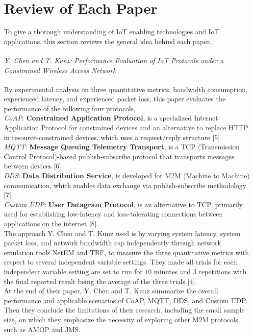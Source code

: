 \documentclass[conference]{IEEEtran}
\begin{document}
\section{Review of Each Paper}
To give a thorough understanding of IoT enabling technologies and IoT applications, this section reviews the general idea behind each paper.\\
\\
\textit{Y. Chen and T. Kunz: Performance Evaluation of IoT Protocols under a Constrained Wireless Access Network}
\\
\\
\text{\quad} By experimental analysis on three quantitative metrics, bandwidth consumption, experienced latency, and experienced packet loss, this paper evaluates the performance of the following four protocols,\\
\text{\quad} \textit{CoAP}: \textbf{Constrained Application Protocol}, is a specialized Internet Application Protocol for constrained devices and an alternative to replace HTTP in resource-constrained devices, which uses a request/reply structure [5]. \\
\text{\quad} \textit{MQTT}: \textbf{Message Queuing Telemetry Transport}, is a TCP (Transmission Control Protocol)-based publish-subscribe protocol that transports messages between devices [6]. \\
\text{\quad} \textit{DDS}: \textbf{Data Distribution Service}, is developed for M2M (Machine to Machine) communication, which enables data exchange via publish-subscribe methodology [7].\\
\text{\quad} \textit{Custom UDP}: \textbf{User Datagram Protocol}, is an alternative to TCP, primarily used for establishing low-latency and loss-tolerating connections between applications on the internet [8]. \\
\text{\quad} The approach Y. Chen and T. Kunz used is by varying system latency, system packet loss, and network bandwidth cap independently through network emulation tools NetEM and TBF, to measure the three quantitative metrics with respect to several independent variable settings. They made all trials for each independent variable setting are set to run 
for $10$ minutes and $3$ repetitions with the final reported result 
being the average of the three trials [4].\\
\text{\quad} At the end of their paper, Y. Chen and T. Kunz summarize the overall performance and applicable scenarios of CoAP, MQTT, DDS, and Custom UDP. Then they conclude the limitations of their research, including the small sample size, on which they emphasize the necessity of exploring other M$2$M protocols such as AMOP and JMS.
\end{document}
